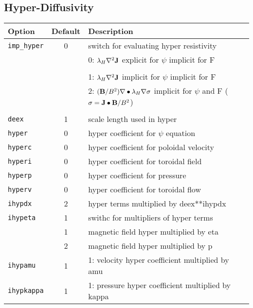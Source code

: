 \subsection{Hyper-Diffusivity}

\begin{tabular}{lcp{4.0in}}
  \textbf{Option} & \textbf{Default} & \textbf{Description}\\
  \hline
  \texttt{imp\_hyper}  & 0 & switch for evaluating hyper resistivity \\
                       &   & 0: $\lambda_H \nabla^2 {\bf J} $ explicit for $\psi$ implicit for F  \\                 \\
                       &   & 1: $\lambda_H \nabla^2 {\bf J} $ implicit for $\psi$ implicit for F  \\                
                       &   & 2: $ ({\bf B}/B^2)\nabla \bullet \lambda_H \nabla \sigma $ implicit for $\psi$ and F    
                                   ($\sigma= {\bf J \bullet B}/B^2 $)  \\                \\
 \texttt{deex}         & 1 & scale length used in hyper \\
 \texttt{hyper}        & 0 & hyper coefficient for $\psi$ equation \\
 \texttt{hyperc}       & 0 & hyper coefficient for poloidal velocity   \\
 \texttt{hyperi}       & 0 & hyper coefficient for toroidal field   \\
 \texttt{hyperp}       & 0 & hyper coefficient for pressure   \\
 \texttt{hyperv}       & 0 & hyper coefficient for toroidal flow   \\
 \texttt{ihypdx}       & 2 & hyper terms multiplied by deex**ihypdx \\
 \texttt{ihypeta}      & 1 & swithc for multipliers of hyper terms   \\
                       & 1 & magnetic field hyper multiplied by eta  \\
                       & 2 & magnetic field hyper multiplied by p\\
 \texttt{ihypamu}            & 1 & 1: velocity hyper coefficient multiplied by amu \\
 \texttt{ihypkappa}          & 1 & 1: pressure hyper coefficient multiplied by kappa \\
\end{tabular}

